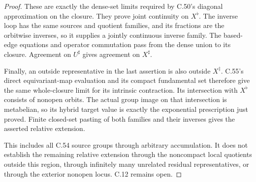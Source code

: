\begin{proof}
These are exactly the dense-set limits required by
C.50's diagonal approximation on the closure.
They prove joint continuity on $X^\flat$.
The inverse loop has the same sources and quotient
families, and its fractions are the orbitwise inverses,
so it supplies a jointly continuous inverse family.
The based-edge equations and operator commutation pass
from the dense union to its closure.
Agreement on $U^\sharp$ gives agreement on $X^\sharp$.

Finally, an outside representative in the last
assertion is also outside $X^\ddagger$.
C.55's direct equivariant-map evaluation and its
compact fundamental set therefore give the same
whole-closure limit for its intrinsic contraction.
Its intersection with $X^\flat$ consists of nonopen
orbits. The actual group image on that intersection
is metabelian, so its hybrid target value is exactly
the exponential prescription just proved.
Finite closed-set pasting of both families and their
inverses gives the asserted relative extension.

This includes all C.54 source groups through arbitrary
accumulation. It does not establish the remaining
relative extension through the noncompact local
quotients outside this region, through infinitely
many unrelated residual representatives, or through
the exterior nonopen locus. C.12 remains open.
\end{proof}
